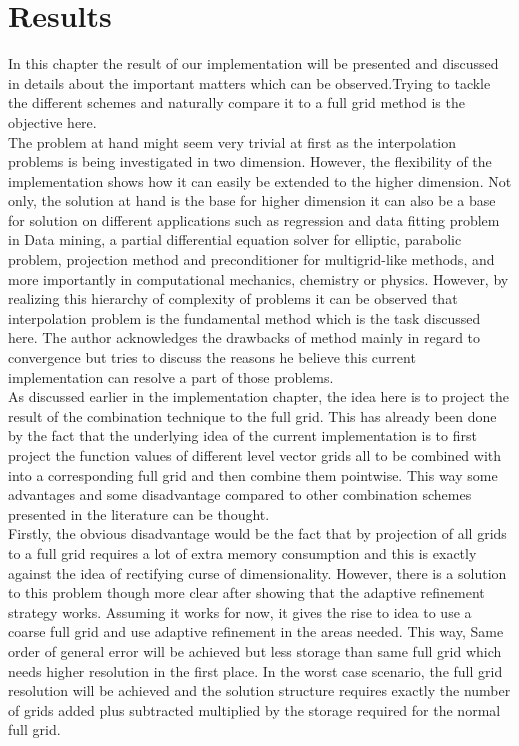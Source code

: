 \chapter{Results}
\label{chapter:results}
In this chapter the result of our implementation will be presented and discussed in details about the important matters which can be observed.Trying to tackle the different schemes and naturally compare it to a full grid method is the objective here. \\
The problem at hand might seem very trivial at first as the interpolation problems is being investigated in two dimension. However, the flexibility of the implementation shows how it can easily be extended to the higher dimension. Not only, the solution at hand is the base for higher dimension it can also be a base for solution on different applications such as regression and data fitting problem in Data mining, a partial differential equation solver for elliptic, parabolic problem, projection method and preconditioner for multigrid-like methods, and more importantly in computational mechanics, chemistry or physics. However, by realizing this hierarchy of complexity of problems it can be observed that interpolation problem is the fundamental method which is the task discussed here. The author acknowledges the drawbacks of method mainly in regard to convergence but tries to discuss the reasons he believe this current implementation can resolve a part of those problems.\\
As discussed earlier in the implementation chapter, the idea here is to project the result of the combination technique to the full grid. This has already been done by the fact that the underlying idea of the current implementation is to first project the function values of different level vector grids all to be combined with into a corresponding full grid and then combine them pointwise. This way some advantages and some disadvantage compared to other combination schemes presented in the literature can be thought. \\
Firstly, the obvious disadvantage would be the fact that by projection of all grids to a full grid requires a lot of extra memory consumption and this is exactly against the idea of rectifying curse of dimensionality. However, there is a solution to this problem though more clear after showing that the adaptive refinement strategy works. Assuming it works for now, it gives the rise to idea to use a coarse full grid and use adaptive refinement in the areas needed. This way, Same order of general error  will be achieved but less storage than same full grid which needs higher resolution in the first place. In the worst case scenario, the full grid resolution will be achieved and the solution structure requires exactly the number of grids added plus subtracted multiplied by the storage required for the normal full grid.\\
